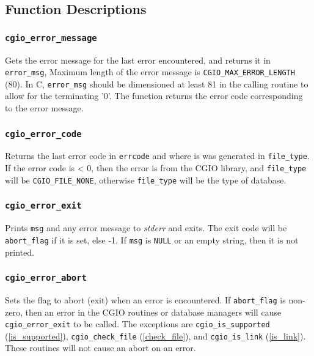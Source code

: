 \subsection{Function Descriptions}

\subsubsection{\texttt{cgio\_error\_message}} \label{error_message}
    \noindent
    Gets the error message for the last error encountered, and returns
    it in \texttt{error\_msg}, Maximum length of the error message is
    \texttt{CGIO\_MAX\_ERROR\_LENGTH} (80). In C, \texttt{error\_msg} should
    be dimensioned at least 81 in the calling routine
    to allow for the terminating '0'. The function returns the error
    code corresponding to the error message.

\subsubsection{\texttt{cgio\_error\_code}} \label{error_code}
    \noindent
    Returns the last error code in \texttt{errcode} and where is was
    generated in \texttt{file\_type}. If the error code is < 0, then
    the error is from the CGIO library, and \texttt{file\_type} will be
    \texttt{CGIO\_FILE\_NONE}, otherwise \texttt{file\_type} will be the
    type of database.

\subsubsection{\texttt{cgio\_error\_exit}} \label{error_exit}
    \noindent
    Prints \texttt{msg} and any error message to \textit{stderr} and exits.
    The exit code will be \texttt{abort\_flag} if it is set, else -1.
    If \texttt{msg} is \texttt{NULL} or
    an empty string, then it is not printed.

\subsubsection{\texttt{cgio\_error\_abort}} \label{error_abort}
    \noindent
    Sets the flag to abort (exit) when an error is encountered. If
    \texttt{abort\_flag} is non-zero, then an error in the CGIO routines
    or database managers will cause \texttt{cgio\_error\_exit} to be called.
    The exceptions are
    \texttt{cgio\_is\_supported} (\autoref{is_supported}),
    \texttt{cgio\_check\_file} (\autoref{check_file}), and
    \texttt{cgio\_is\_link} (\autoref{is_link}). These routines
    will not cause an abort on an error.

